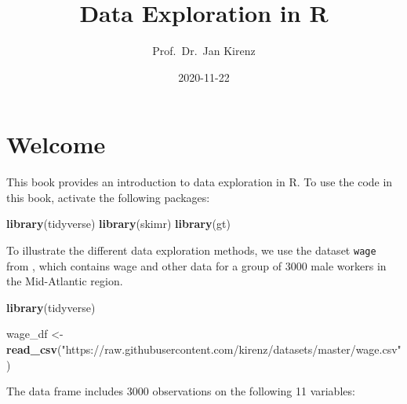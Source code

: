 \documentclass[
]{book}
\title{Data Exploration in R}
\author{Prof.~Dr.~Jan Kirenz}
\date{2020-11-22}
\newenvironment{Shaded}{\begin{snugshade}}{\end{snugshade}}
\newcommand{\KeywordTok}[1]{\textcolor[rgb]{0.13,0.29,0.53}{\textbf{#1}}}
\newcommand{\NormalTok}[1]{#1}
\newcommand{\StringTok}[1]{\textcolor[rgb]{0.31,0.60,0.02}{#1}}
\begin{document}
\maketitle

{
\setcounter{tocdepth}{1}
\tableofcontents
}
\hypertarget{welcome}{%
\chapter*{Welcome}\label{welcome}}

This book provides an introduction to data exploration in R. To use the code in this book, activate the following packages:

\begin{Shaded}
\begin{Highlighting}[]
\KeywordTok{library}\NormalTok{(tidyverse)}
\KeywordTok{library}\NormalTok{(skimr)}
\KeywordTok{library}\NormalTok{(gt)}
\end{Highlighting}
\end{Shaded}

To illustrate the different data exploration methods, we use the dataset \texttt{wage} from \citet{James2000}, which contains wage and other data for a group of 3000 male workers in the Mid-Atlantic region.

\begin{Shaded}
\begin{Highlighting}[]
\KeywordTok{library}\NormalTok{(tidyverse)}

\NormalTok{wage\_df \textless{}{-}}\StringTok{ }\KeywordTok{read\_csv}\NormalTok{(}\StringTok{"https://raw.githubusercontent.com/kirenz/datasets/master/wage.csv"}\NormalTok{)}
\end{Highlighting}
\end{Shaded}

The data frame includes 3000 observations on the following 11 variables:
\end{document}
